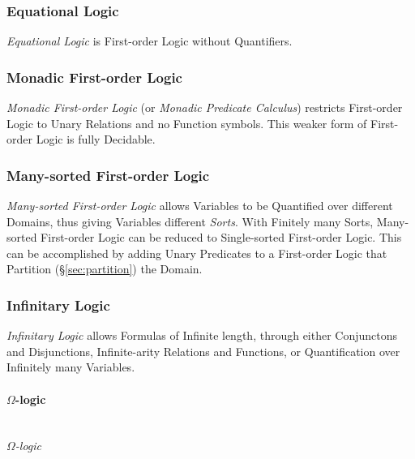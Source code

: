 \subsubsection{Equational Logic}\label{sec:equational_logic}

\emph{Equational Logic} is First-order Logic without Quantifiers.



\subsubsection{Monadic First-order Logic}\label{sec:monadic_firstorder}

\emph{Monadic First-order Logic} (or \emph{Monadic Predicate
  Calculus}) restricts First-order Logic to Unary Relations and no
Function symbols. This weaker form of First-order Logic is fully
Decidable.



\subsubsection{Many-sorted First-order Logic}\label{sec:many_sorted_logic}

\emph{Many-sorted First-order Logic} allows Variables to be Quantified
over different Domains, thus giving Variables different \emph{Sorts}.
With Finitely many Sorts, Many-sorted First-order Logic can be reduced
to Single-sorted First-order Logic. This can be accomplished by adding
Unary Predicates to a First-order Logic that Partition
(\S\ref{sec:partition}) the Domain.



\subsubsection{Infinitary Logic}\label{sec:infinitary_logic}

\emph{Infinitary Logic} allows Formulas of Infinite length, through
either Conjunctons and Disjunctions, Infinite-arity Relations and
Functions, or Quantification over Infinitely many Variables.



\paragraph{$\Omega$-logic}\label{sec:omega_logic}\hfill \\

\emph{$\Omega$-logic}



